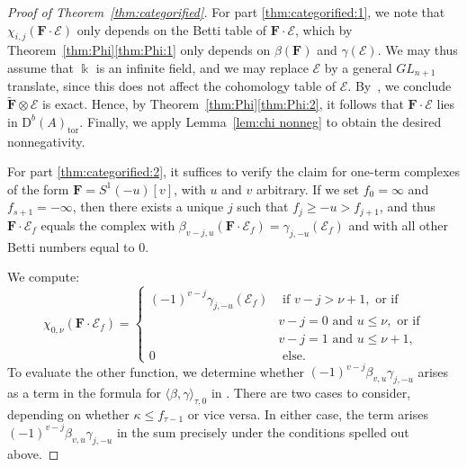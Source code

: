 \documentclass[12pt]{amsart}
\theoremstyle{definition}
\theoremstyle{remark}
\newcommand{\kk}{\Bbbk}
\newcommand{\cE}{\mathcal{E}}
\newcommand{\FF}{\mathbf{F}}
\newcommand{\GL}{{GL}}
\newcommand{\DD}{\mathrm{D}}
\begin{document}
\begin{proof}[Proof of Theorem~\ref{thm:categorified}]
For part \eqref{thm:categorified:1}, we note that $\chi_{i,j}(\FF\cdot \cE)$ only depends on the Betti table of $\FF\cdot \cE$, which by Theorem~\ref{thm:Phi}\eqref{thm:Phi:1} only depends on $\beta(\FF)$ and $\gamma(\cE)$.  We may thus assume that $\kk$ is an infinite field, and we may replace $\cE$ by a general $\GL_{n+1}$ translate, since this does not affect the cohomology table of $\cE$.  By~\cite[Theorem, p.\ 335]{miller-speyer}, we  conclude $\widetilde{\FF}\otimes \cE$ is exact.  Hence, by Theorem~\ref{thm:Phi}\eqref{thm:Phi:2}, it follows that $\FF\cdot \cE$ lies in $\DD^b(A)_{\text{tor}}$.  Finally, we apply Lemma~\ref{lem:chi nonneg} to obtain the desired nonnegativity.


For part \eqref{thm:categorified:2}, 
it suffices to verify the claim for one-term complexes of the form $\FF=S^1(-u)[v]$, with $u$ and $v$ arbitrary.  
If we set $f_0=\infty$ and $f_{s+1}=-\infty$, then there exists a unique $j$ such that $f_j\geq -u>f_{j+1}$, and thus $\FF\cdot \cE_f$ equals the complex with $\beta_{v-j,u}(\FF\cdot \cE_f)=\gamma_{j,-u}(\cE_f)$ and with all other Betti numbers equal to $0$.  

We compute:
\[
\chi_{0,\nu}(\FF\cdot \cE_f)=
\begin{cases}
(-1)^{v-j}\gamma_{j,-u}(\cE_f)&\text{ if } v-j>\nu+1, \text{ or if } \\
&v-j=0 \text{ and }  u\leq \nu, \text{ or if}\\
&v-j=1 \text{ and }  u\leq \nu+1,\\
0 & \text{ else}.
\end{cases}
\]
To evaluate the other function, we determine whether $(-1)^{v-j}\beta_{v,u} \gamma_{j,-u}$ arises as a term in the formula for $\langle \beta,\gamma\rangle_{\tau,0}$ in \cite[\S3]{eis-schrey-icm}.   There are two cases to consider, depending on whether $\kappa\leq f_{\tau-1}$ or vice versa.  In either case, the term arises  $(-1)^{v-j}\beta_{v,u} \gamma_{j,-u}$ in the sum precisely under the conditions spelled out above.
\end{proof}
\end{document}
